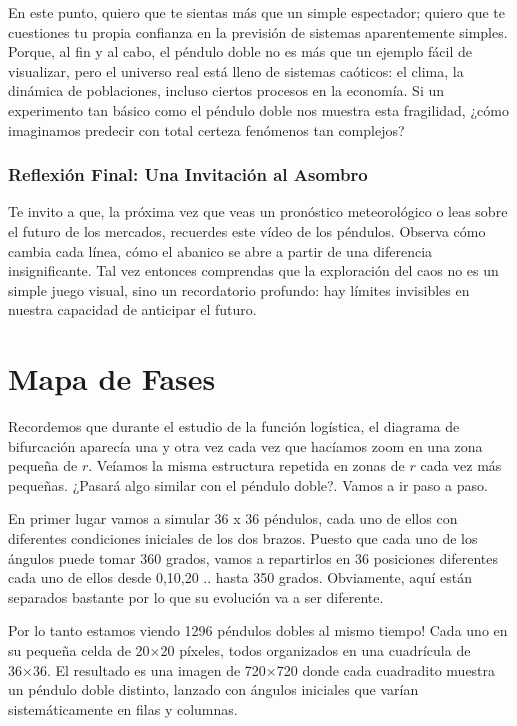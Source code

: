 \documentclass[
  10pt,
  a4paper,
  DIV=11,
  numbers=noendperiod,
  open=any]{scrreprt}
\numberwithin{equation}{chapter}
\numberwithin{equation}{chapter}
\renewcommand{\[}{\begin{equation}}
\renewcommand{\]}{\end{equation}}
\begin{document}
En este punto, quiero que te sientas más que un simple espectador;
quiero que te cuestiones tu propia confianza en la previsión de sistemas
aparentemente simples. Porque, al fin y al cabo, el péndulo doble no es
más que un ejemplo fácil de visualizar, pero el universo real está lleno
de sistemas caóticos: el clima, la dinámica de poblaciones, incluso
ciertos procesos en la economía. Si un experimento tan básico como el
péndulo doble nos muestra esta fragilidad, ¿cómo imaginamos predecir con
total certeza fenómenos tan complejos?

\subsection{Reflexión Final: Una Invitación al
Asombro}\label{reflexiuxf3n-final-una-invitaciuxf3n-al-asombro}

Te invito a que, la próxima vez que veas un pronóstico meteorológico o
leas sobre el futuro de los mercados, recuerdes este vídeo de los
péndulos. Observa cómo cambia cada línea, cómo el abanico se abre a
partir de una diferencia insignificante. Tal vez entonces comprendas que
la exploración del caos no es un simple juego visual, sino un
recordatorio profundo: hay límites invisibles en nuestra capacidad de
anticipar el futuro.


\chapter{Mapa de Fases}\label{mapa-de-fases}

Recordemos que durante el estudio de la función logística, el diagrama
de bifurcación aparecía una y otra vez cada vez que hacíamos zoom en una
zona pequeña de \(r\). Veíamos la misma estructura repetida en zonas de
\(r\) cada vez más pequeñas. ¿Pasará algo similar con el péndulo doble?.
Vamos a ir paso a paso.

En primer lugar vamos a simular 36 x 36 péndulos, cada uno de ellos con
diferentes condiciones iniciales de los dos brazos. Puesto que cada uno
de los ángulos puede tomar 360 grados, vamos a repartirlos en 36
posiciones diferentes cada uno de ellos desde 0,10,20 .. hasta 350
grados. Obviamente, aquí están separados bastante por lo que su
evolución va a ser diferente.

Por lo tanto estamos viendo 1296 péndulos dobles al mismo tiempo! Cada
uno en su pequeña celda de 20×20 píxeles, todos organizados en una
cuadrícula de 36×36. El resultado es una imagen de 720×720 donde cada
cuadradito muestra un péndulo doble distinto, lanzado con ángulos
iniciales que varían sistemáticamente en filas y columnas.
\end{document}
